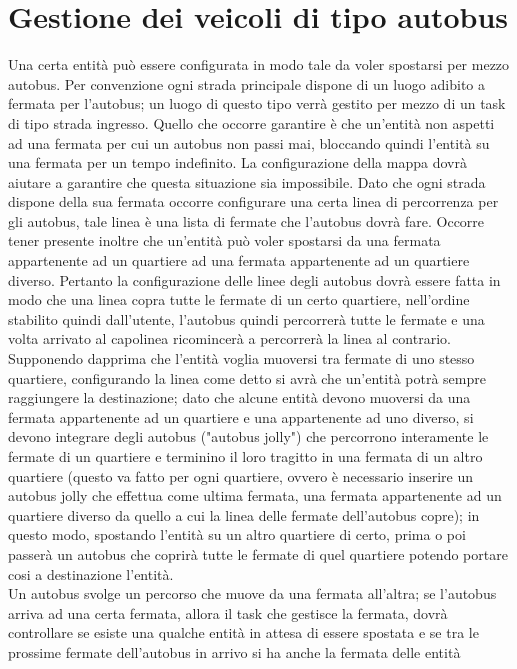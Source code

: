 \section{Gestione dei veicoli di tipo autobus}
 Una certa entità può essere configurata in modo tale da voler spostarsi per
mezzo autobus. Per convenzione ogni strada principale dispone di un luogo
adibito a fermata per l'autobus; un luogo di questo tipo verrà gestito per
mezzo di un task di tipo strada ingresso. Quello che occorre garantire è che
un'entità non aspetti ad una fermata per cui un autobus non passi mai,
bloccando quindi l'entità su una fermata per un tempo indefinito. La
configurazione della mappa dovrà aiutare a garantire che questa situazione sia
impossibile. Dato che ogni strada dispone della sua fermata occorre configurare
una certa linea di percorrenza per gli autobus, tale linea è una lista di
fermate che l'autobus dovrà fare. Occorre tener presente inoltre che un'entità
può voler spostarsi da una fermata appartenente ad un quartiere ad una fermata
appartenente ad un quartiere diverso. Pertanto la configurazione delle linee
degli autobus dovrà essere fatta in modo che una linea copra tutte le fermate
di un certo quartiere, nell'ordine stabilito quindi dall'utente, l'autobus
quindi percorrerà tutte le fermate e una volta arrivato al capolinea
ricomincerà a percorrerà la linea al contrario. Supponendo dapprima che
l'entità voglia muoversi tra fermate di uno stesso quartiere, configurando la
linea come detto si avrà che un'entità potrà sempre raggiungere la
destinazione; dato che alcune entità devono muoversi da una fermata
appartenente ad un quartiere e una appartenente ad uno diverso, si devono
integrare degli autobus ("autobus jolly") che percorrono interamente le fermate
di un quartiere e terminino il loro tragitto in una fermata di un altro
quartiere (questo va fatto per ogni quartiere, ovvero è necessario inserire un
autobus jolly che effettua come ultima fermata, una fermata appartenente ad un
quartiere diverso da quello a cui la linea delle fermate dell'autobus copre);
in questo modo, spostando l'entità su un altro quartiere di certo, prima o poi
passerà un autobus che coprirà tutte le fermate di quel quartiere potendo
portare cosi a destinazione l'entità.\\
Un autobus svolge un percorso che muove da una fermata all'altra; se l'autobus
arriva ad una certa fermata, allora il task che gestisce la fermata, dovrà
controllare se esiste una qualche entità in attesa di essere spostata e se tra
le prossime fermate dell'autobus in arrivo si ha anche la fermata delle entità

